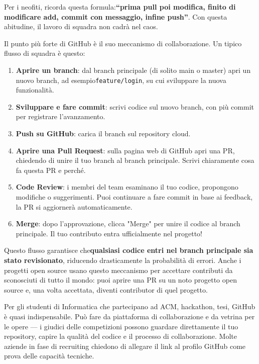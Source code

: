 Per i neofiti, ricorda questa formula:\textbf{“prima pull poi modifica, finito di modificare add, commit con messaggio, infine push”}. Con questa abitudine, il lavoro di squadra non cadrà nel caos.


Il punto più forte di GitHub è il suo meccanismo di collaborazione. Un tipico flusso di squadra è questo:

\begin{enumerate}
  \item \textbf{Aprire un branch}: dal branch principale (di solito main o master) apri un nuovo branch, ad esempio\texttt{feature/\allowbreak login}, su cui sviluppare la nuova funzionalità.
  \item \textbf{Sviluppare e fare commit}: scrivi codice sul nuovo branch, con più commit per registrare l'avanzamento.
  \item \textbf{Push su GitHub}: carica il branch sul repository cloud.
  \item \textbf{Aprire una Pull Request}: sulla pagina web di GitHub apri una PR, chiedendo di unire il tuo branch al branch principale. Scrivi chiaramente cosa fa questa PR e perché.
  \item \textbf{Code Review}: i membri del team esaminano il tuo codice, propongono modifiche o suggerimenti. Puoi continuare a fare commit in base ai feedback, la PR si aggiornerà automaticamente.
  \item \textbf{Merge}: dopo l'approvazione, clicca "Merge" per unire il codice al branch principale. Il tuo contributo entra ufficialmente nel progetto!
\end{enumerate}

Questo flusso garantisce che\textbf{qualsiasi codice entri nel branch principale sia stato revisionato}, riducendo drasticamente la probabilità di errori. Anche i progetti open source usano questo meccanismo per accettare contributi da sconosciuti di tutto il mondo: puoi aprire una PR su un noto progetto open source e, una volta accettata, diventi contributor di quel progetto.



Per gli studenti di Informatica che partecipano ad ACM, hackathon, tesi, GitHub è quasi indispensabile. Può fare da piattaforma di collaborazione e da vetrina per le opere — i giudici delle competizioni possono guardare direttamente il tuo repository, capire la qualità del codice e il processo di collaborazione. Molte aziende in fase di recruiting chiedono di allegare il link al profilo GitHub come prova delle capacità tecniche.

